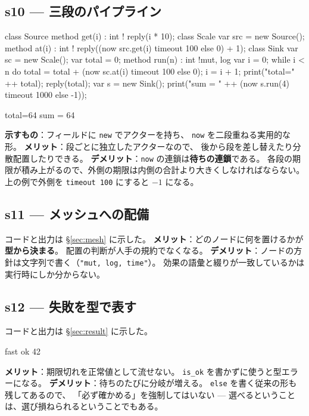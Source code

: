 \documentclass[11pt,a4paper]{ltjsarticle}
\theoremstyle{definition}
\theoremstyle{remark}
\begin{document}
\subsection{s10 --- 三段のパイプライン}
\begin{aipl}
class Source { method get(i) : int !{} { reply(i * 10); } }
class Scale  {
  var src = new Source();
  method at(i) : int !{} { reply((now src.get(i) timeout 100 else 0) + 1); }
}
class Sink {
  var sc = new Scale();
  var total = 0;
  method run(n) : int !{mut, log} {
    var i = 0;
    while i < n do {
      total = total + (now sc.at(i) timeout 100 else 0);
      i = i + 1;
    }
    print("total=" ++ total);
    reply(total);
  }
}
var s = new Sink();
print("sum = " ++ (now s.run(4) timeout 1000 else -1));
\end{aipl}
\begin{term}
total=64
sum = 64
\end{term}
\textbf{示すもの}：フィールドに \texttt{new} でアクターを持ち、
\texttt{now} を二段重ねる実用的な形。
\textbf{メリット}：段ごとに独立したアクターなので、
後から段を差し替えたり分散配置したりできる。
\textbf{デメリット}：\texttt{now} の連鎖は\textbf{待ちの連鎖}である。
各段の期限が積み上がるので、外側の期限は内側の合計より大きくしなければならない。
上の例で外側を \texttt{timeout 100} にすると $-1$ になる。

\subsection{s11 --- メッシュへの配備}
コードと出力は \S\ref{sec:mesh} に示した。
\textbf{メリット}：どのノードに何を置けるかが\textbf{型から決まる}。
配置の判断が人手の規約でなくなる。
\textbf{デメリット}：ノードの方針は文字列で書く（\texttt{"mut, log, time"}）。
効果の語彙と綴りが一致しているかは実行時にしか分からない。

\subsection{s12 --- 失敗を型で表す}
コードと出力は \S\ref{sec:result} に示した。
\begin{term}
fast ok 42
\end{term}
\textbf{メリット}：期限切れを正常値として流せない。
\texttt{is\_ok} を書かずに使うと型エラーになる。
\textbf{デメリット}：待ちのたびに分岐が増える。
\texttt{else} を書く従来の形も残してあるので、
「必ず確かめる」を強制してはいない --- 選べるということは、選び損ねられるということでもある。
\end{document}
